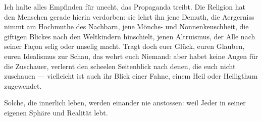 Ich halte alles Empfinden für unecht, das Propaganda treibt. Die Religion hat den Menschen gerade hierin verdorben: sie lehrt ihn jene Demuth, die Aergerniss nimmt am Hochmuthe des Nachbarn, jene Mönchs- und Nonnenkeuschheit, die giftigen Blickes nach den Weltkindern hinschielt, jenen Altruismus, der Alle nach seiner Façon selig oder unselig macht. Tragt doch euer Glück, euren Glauben, euren Idealismus zur Schau, das wehrt euch Niemand: aber habet keine Augen für die Zuschauer, verlernt den scheelen Seitenblick nach denen, die euch nicht zuschauen  — vielleicht ist auch ihr Blick einer Fahne, einem Heil oder Heiligthum zugewendet.
\par

Solche, die innerlich leben, werden einander nie anstossen: weil Jeder in seiner eigenen Sphäre und Realität lebt.
\par

